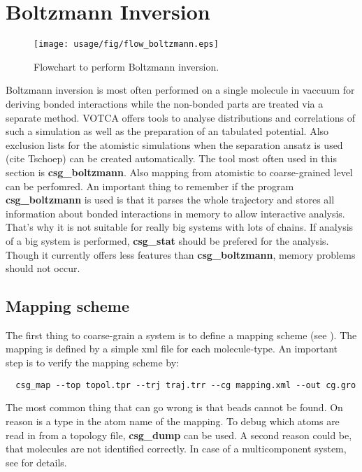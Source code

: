 \section{Boltzmann Inversion}
\begin{figure}
   \centering
   \texttt{[image: usage/fig/flow\_boltzmann.eps]}
   \caption{Flowchart to perform Boltzmann inversion.}
\end{figure}

Boltzmann inversion is most often performed on a single molecule in vaccuum for deriving bonded interactions while the non-bonded parts are treated via a separate method. VOTCA offers tools to analyse distributions and correlations of such a simulation as well as the preparation of an tabulated potential. Also exclusion lists for the atomistic simulations when the separation ansatz is used (cite Tschoep) can be created automatically. The tool most often used in this section is \textbf{csg\_boltzmann}. Also mapping from atomistic to coarse-grained level can be perfomred. An important thing to remember if the program \textbf{csg\_boltzmann} is used is that it parses the whole trajectory and stores all information about bonded interactions in memory to allow interactive analysis. That's why it is not suitable for really big systems with lots of chains. If analysis of a big system is performed, \textbf{csg\_stat} should be prefered for the analysis. Though it currently offers less features than \textbf{csg\_boltzmann}, memory problems should not occur.

\subsection{Mapping scheme}
The first thing to coarse-grain a system is to define a mapping scheme (see ). The mapping is defined by a simple xml file for each molecule-type. An important step is to verify the mapping scheme by:

\begin{verbatim}
  csg_map --top topol.tpr --trj traj.trr --cg mapping.xml --out cg.gro
\end{verbatim}

The most common thing that can go wrong is that beads cannot be found. On reason is a type in the atom name of the mapping. To debug which atoms are read in from a topology file, \textbf{csg\_dump} can be used. A second reason could be, that molecules are not identified correctly. In case of a multicomponent system, see  for details.

